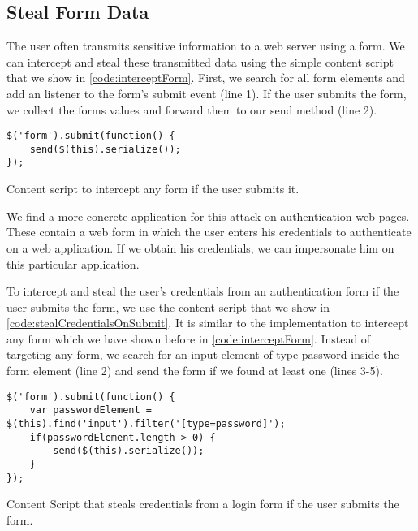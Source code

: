 \subsection{Steal Form Data}

	The user often transmits sensitive information to a web server using a form. We can intercept and steal these transmitted data using the simple content script that we show in \autoref{code:interceptForm}. First, we search for all form elements and add an listener to the form's submit event (line 1). If the user submits the form, we collect the forms values and forward them to our send method (line 2).
	
	\begin{code}
		\begin{lstlisting}
$('form').submit(function() {
	send($(this).serialize());
});
		\end{lstlisting}
		\caption{Content script to intercept any form if the user submits it.}
		\label{code:interceptForm}
	\end{code}
	
	We find a more concrete application for this attack on authentication web pages. These contain a web form in which the user enters his credentials to authenticate on a web application. If we obtain his credentials, we can impersonate him on this particular application. 
	
	To intercept and steal the user's credentials from an authentication form if the user submits the form, we use the content script that we show in \autoref{code:stealCredentialsOnSubmit}. It is similar to the implementation to intercept any form which we have shown before in \autoref{code:interceptForm}. Instead of targeting any form, we search for an input element of type password inside the form element (line 2) and send the form if we found at least one (lines 3-5).

	\begin{code}
		\begin{lstlisting}	
$('form').submit(function() {
	var passwordElement = $(this).find('input').filter('[type=password]');
	if(passwordElement.length > 0) {
		send($(this).serialize());
	}
});		
\end{lstlisting}
		\caption{Content Script that steals credentials from a login form if the user submits the form.}
		\label{code:stealCredentialsOnSubmit}
	\end{code}


